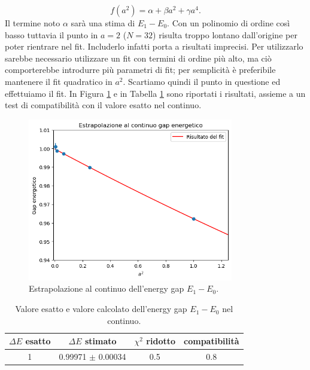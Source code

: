 \documentclass{article}
\begin{document}
\begin{equation}
    f(a^2)=\alpha+\beta a^2+\gamma a^4.
\end{equation}
Il termine noto $\alpha$ sarà una stima di $E_1-E_0$.
Con un polinomio di ordine così basso tuttavia il punto in $a=2$ ($N=32$) risulta troppo lontano dall'origine per poter rientrare nel fit. Includerlo infatti porta a risultati imprecisi. Per utilizzarlo sarebbe necessario utilizzare un fit con termini di ordine più alto, ma ciò comporterebbe introdurre più parametri di fit; per semplicità è preferibile mantenere il fit quadratico in $a^2$. Scartiamo quindi il punto in questione ed effettuiamo il fit. 
In Figura \ref{grafico estrapolazione deltaE} e in Tabella \ref{tabella energie continuo} sono riportati i risultati, assieme a un test di compatibilità con il valore esatto nel continuo. 
\begin{figure}[h]
    \centering
    \includegraphics[width=0.8\textwidth]{images/deltaE_estrapolazione.png}
    \caption{Estrapolazione al continuo dell'energy gap $E_1-E_0$.}
    \label{grafico estrapolazione deltaE}
\end{figure}
\begin{table}[h]
    \centering
    \begin{tabular}{||c c c c||} 
     \hline
    $\Delta E$ esatto & $\Delta E$ stimato & $\chi^2$ ridotto & compatibilità\\[0.5ex] 
     \hline\hline
     1 & 0.99971 $\pm$ 0.00034 & 0.5 & 0.8 \\[1ex] 
     \hline
    \end{tabular}
    \caption{Valore esatto e valore calcolato dell'energy gap $E_1-E_0$ nel continuo.}
    \label{tabella energie continuo}
\end{table}
\end{document}

